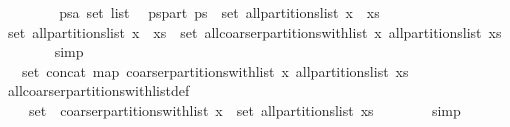\begin{isabellebody}
\ \ \isamarkupfalse%
\isanewline
\ \ \ \ \isamarkupfalse%
\ ps{\isacharcolon}{\isacharcolon}{\isachardoublequoteopen}{\isacharprime}a\ set\ list{\isachardoublequoteclose}\ \isamarkupfalse%
\ ps{\isacharunderscore}part{\isacharcolon}\ {\isachardoublequoteopen}ps\ {\isasymin}\ set\ {\isacharparenleft}all{\isacharunderscore}partitions{\isacharunderscore}list\ {\isacharparenleft}x\ {\isacharhash}\ xs{\isacharparenright}{\isacharparenright}{\isachardoublequoteclose}\isanewline
\isanewline
\ \ \ \ \isamarkupfalse%
\ {\isachardoublequoteopen}set\ {\isacharparenleft}all{\isacharunderscore}partitions{\isacharunderscore}list\ {\isacharparenleft}x\ {\isacharhash}\ xs{\isacharparenright}{\isacharparenright}\ {\isacharequal}\ set\ {\isacharparenleft}all{\isacharunderscore}coarser{\isacharunderscore}partitions{\isacharunderscore}with{\isacharunderscore}list\ x\ {\isacharparenleft}all{\isacharunderscore}partitions{\isacharunderscore}list\ xs{\isacharparenright}{\isacharparenright}{\isachardoublequoteclose}\isanewline
\ \ \ \ \ \ \isamarkupfalse%
\ simp\isanewline
\ \ \ \ \isamarkupfalse%
\ \isamarkupfalse%
\ {\isachardoublequoteopen}{\isasymdots}\ {\isacharequal}\ set\ {\isacharparenleft}concat\ {\isacharparenleft}map\ {\isacharparenleft}coarser{\isacharunderscore}partitions{\isacharunderscore}with{\isacharunderscore}list\ x{\isacharparenright}\ {\isacharparenleft}all{\isacharunderscore}partitions{\isacharunderscore}list\ xs{\isacharparenright}{\isacharparenright}{\isacharparenright}{\isachardoublequoteclose}\isanewline
\ \ \ \ \ \ \isamarkupfalse%
\ all{\isacharunderscore}coarser{\isacharunderscore}partitions{\isacharunderscore}with{\isacharunderscore}list{\isacharunderscore}def\ \isacommand{{\isachardot}{\isachardot}}\isamarkupfalse%
\isanewline
\ \ \ \ \isamarkupfalse%
\ \isamarkupfalse%
\ {\isachardoublequoteopen}{\isasymdots}\ {\isacharequal}\ {\isasymUnion}\ {\isacharparenleft}{\isacharparenleft}set\ {\isasymcirc}\ {\isacharparenleft}coarser{\isacharunderscore}partitions{\isacharunderscore}with{\isacharunderscore}list\ x{\isacharparenright}{\isacharparenright}\ {\isacharbackquote}\ {\isacharparenleft}set\ {\isacharparenleft}all{\isacharunderscore}partitions{\isacharunderscore}list\ xs{\isacharparenright}{\isacharparenright}{\isacharparenright}{\isachardoublequoteclose}\isanewline
\ \ \ \ \ \ \isamarkupfalse%
\ simp\isanewline
\ \ \ \ \isamarkupfalse%
\ \isamarkupfalse%

\end{isabellebody}
